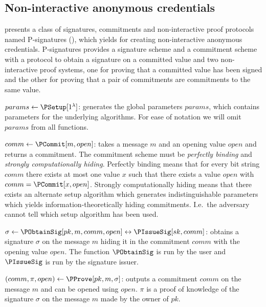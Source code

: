 \subsection{Non-interactive anonymous credentials}%
\label{NIZK-anon-cred}


 presents a class of signatures, commitments and 
non-interactive proof protocols named P-signatures (\Psig), which yields for 
creating non-interactive anonymous credentials.
P-signatures provides a signature scheme and a commitment scheme with a protocol 
to obtain a signature on a committed value and two non-interactive proof 
systems, one for proving that a committed value has been signed and the other 
for proving that a pair of commitments are commitments to the same value.


\(params\gets \PSetup[1^\lambda]\): generates the global parameters \(params\), 
which contains parameters for the underlying algorithms.
For ease of notation we will omit \(params\) from all functions.


\(comm\gets \PCommit[m, open]\): takes a message \(m\) and an opening value 
\(open\) and returns a commitment.
The commitment scheme must be \emph{perfectly binding} and \emph{strongly 
  computationally hiding}.
Perfectly binding means that for every bit string \(comm\) there exists at most 
one value \(x\) such that there exists a value \(open\) with \(comm = 
  \PCommit[x, open]\).
Strongly computationally hiding means that there exists an alternate setup 
algorithm which generates indistinguishable parameters which yields 
information-theoretically hiding commitments.
I.e.\ the adversary cannot tell which setup algorithm has been used.


\(\sigma\gets \PObtainSig[pk, m, comm, open]\leftrightarrow
  \PIssueSig[sk, comm]\): obtains a signature \(\sigma\) on the message 
\(m\) hiding it in the commitment \(comm\) with the opening value \(open\).
The function \(\PObtainSig\) is run by the user and \(\PIssueSig\) is run by the 
signature issuer.


\((comm, \pi, open)\gets \PProve[pk, m, \sigma]\): outputs a commitment 
\(comm\) on the message \(m\) and can be opened using \(open\).
\(\pi\) is a proof of knowledge of the signature \(\sigma\) on the message \(m\) 
made by the owner of \(pk\).

